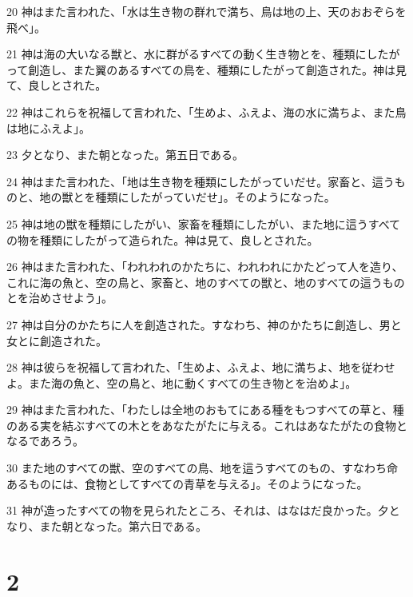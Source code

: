 \par 20 神はまた言われた、「水は生き物の群れで満ち、鳥は地の上、天のおおぞらを飛べ」。
\par 21 神は海の大いなる獣と、水に群がるすべての動く生き物とを、種類にしたがって創造し、また翼のあるすべての鳥を、種類にしたがって創造された。神は見て、良しとされた。
\par 22 神はこれらを祝福して言われた、「生めよ、ふえよ、海の水に満ちよ、また鳥は地にふえよ」。
\par 23 夕となり、また朝となった。第五日である。
\par 24 神はまた言われた、「地は生き物を種類にしたがっていだせ。家畜と、這うものと、地の獣とを種類にしたがっていだせ」。そのようになった。
\par 25 神は地の獣を種類にしたがい、家畜を種類にしたがい、また地に這うすべての物を種類にしたがって造られた。神は見て、良しとされた。
\par 26 神はまた言われた、「われわれのかたちに、われわれにかたどって人を造り、これに海の魚と、空の鳥と、家畜と、地のすべての獣と、地のすべての這うものとを治めさせよう」。
\par 27 神は自分のかたちに人を創造された。すなわち、神のかたちに創造し、男と女とに創造された。
\par 28 神は彼らを祝福して言われた、「生めよ、ふえよ、地に満ちよ、地を従わせよ。また海の魚と、空の鳥と、地に動くすべての生き物とを治めよ」。
\par 29 神はまた言われた、「わたしは全地のおもてにある種をもつすべての草と、種のある実を結ぶすべての木とをあなたがたに与える。これはあなたがたの食物となるであろう。
\par 30 また地のすべての獣、空のすべての鳥、地を這うすべてのもの、すなわち命あるものには、食物としてすべての青草を与える」。そのようになった。
\par 31 神が造ったすべての物を見られたところ、それは、はなはだ良かった。夕となり、また朝となった。第六日である。

\chapter{2}

